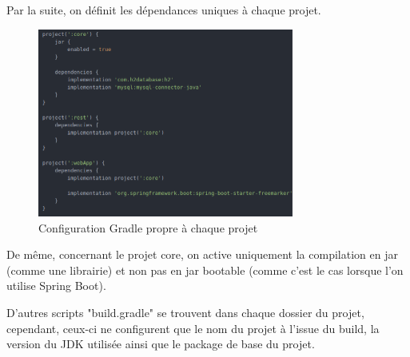 			\newpage
			Par la suite, on définit les dépendances uniques à chaque projet.

			\begin{figure}[H]
				\centering\includegraphics[width=0.75\textwidth, keepaspectratio]{res/gradle_project.png}
				\caption{Configuration Gradle propre à chaque projet}
			\end{figure}

			De même, concernant le projet core, on active uniquement la compilation en jar (comme une librairie) et non pas en jar bootable (comme c'est le cas lorsque l'on utilise Spring Boot).
			
			\noindent
			D'autres scripts "build.gradle" se trouvent dans chaque dossier du projet, cependant, ceux-ci ne configurent que le nom du projet à l'issue du build, la version du JDK utilisée ainsi que le package de base du projet.
